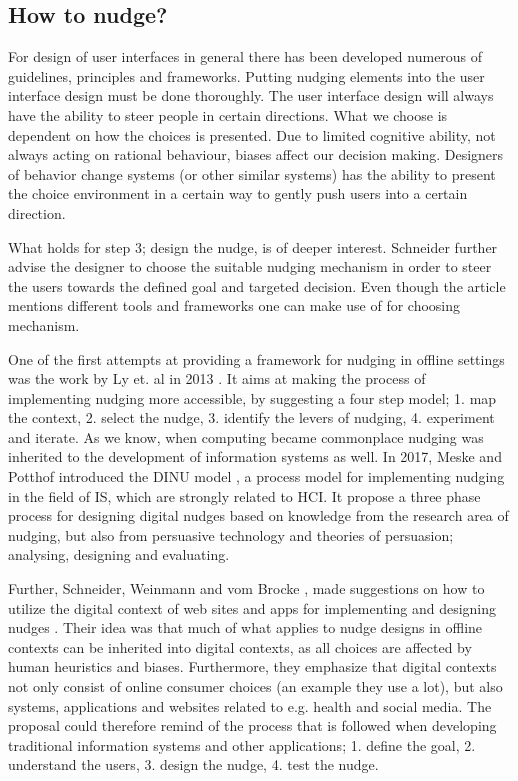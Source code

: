 \subsection{How to nudge?}
For design of user interfaces in general there has been developed numerous of guidelines, principles and frameworks. Putting nudging elements into the user interface design must be done thoroughly. The user interface design will always have the ability to steer people in certain directions\cite{schneider_digital_2018}. 
What we choose is dependent on how the choices is presented. Due to limited cognitive ability, not always acting on rational behaviour, biases affect our decision making. Designers of behavior change systems (or other similar systems) has the ability to present the choice environment in a certain way to gently push users into a certain direction. 

What holds for step 3; design the nudge, is of deeper interest. Schneider further advise the designer to choose the suitable nudging mechanism in order to steer the users towards the defined goal and targeted decision. Even though the article mentions different tools and frameworks one can make use of for choosing mechanism. 

One of the first attempts at providing a framework for nudging in offline settings was the work by Ly et. al 
in 2013 \cite{ly_practitioners_2013}. It aims at making the process of implementing nudging more accessible, by suggesting a four step model; 1. map the context, 2. select the nudge, 3. identify the levers of nudging, 4. experiment and iterate. As we know, when computing became commonplace nudging was inherited to the development of information systems as well. In 2017, Meske and Potthof introduced the DINU model \cite{meske_dinu-model_2017},
a process model for implementing nudging in the field of IS, which are strongly related to HCI. It propose a three phase process for designing digital nudges based on knowledge from the research area of nudging, but also from persuasive technology and theories of persuasion; analysing, designing and evaluating. 

Further, Schneider, Weinmann and vom Brocke \cite{schneider_digital_2018}, made suggestions on how to utilize the digital context of web sites and apps for implementing and designing nudges .
Their idea was that much of what applies to nudge designs in offline contexts can be inherited into digital contexts, as all choices are affected by human heuristics and biases. Furthermore, they emphasize that digital contexts not only consist of online consumer choices (an example they use a lot), but also systems, applications and websites related to e.g. health and social media. The proposal could therefore remind of the process that is followed when developing traditional information systems and other applications; 1. define  the  goal, 2. understand  the  users, 3. design  the  nudge,  4. test  the  nudge. 


